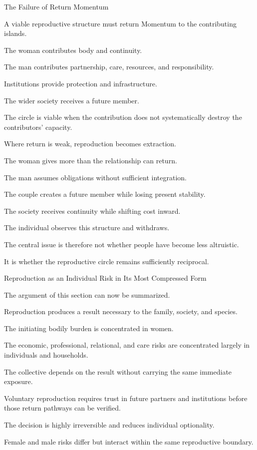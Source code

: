 The Failure of Return Momentum

A viable reproductive structure must return Momentum to the contributing islands.

The woman contributes body and continuity.

The man contributes partnership, care, resources, and responsibility.

Institutions provide protection and infrastructure.

The wider society receives a future member.

The circle is viable when the contribution does not systematically destroy the contributors’ capacity.

Where return is weak, reproduction becomes extraction.

The woman gives more than the relationship can return.

The man assumes obligations without sufficient integration.

The couple creates a future member while losing present stability.

The society receives continuity while shifting cost inward.

The individual observes this structure and withdraws.

The central issue is therefore not whether people have become less altruistic.

It is whether the reproductive circle remains sufficiently reciprocal.

Reproduction as an Individual Risk in Its Most Compressed Form

The argument of this section can now be summarized.

Reproduction produces a result necessary to the family, society, and species.

The initiating bodily burden is concentrated in women.

The economic, professional, relational, and care risks are concentrated largely in individuals and households.

The collective depends on the result without carrying the same immediate exposure.

Voluntary reproduction requires trust in future partners and institutions before those return pathways can be verified.

The decision is highly irreversible and reduces individual optionality.

Female and male risks differ but interact within the same reproductive boundary.

